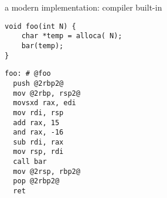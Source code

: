 \begin{frame}[fragile,label=modernAlloca]{a modern implementation: compiler built-in}
\begin{lstlisting}
void foo(int N) {
    char *temp = alloca( N);
    bar(temp);
}
\end{lstlisting}
\begin{lstlisting}
foo: # @foo
  push @2rbp2@
  mov @2rbp, rsp2@
  movsxd rax, edi
  mov rdi, rsp
  add rax, 15
  and rax, -16
  sub rdi, rax
  mov rsp, rdi
  call bar
  mov @2rsp, rbp2@
  pop @2rbp2@
  ret
\end{lstlisting}
\end{frame}
